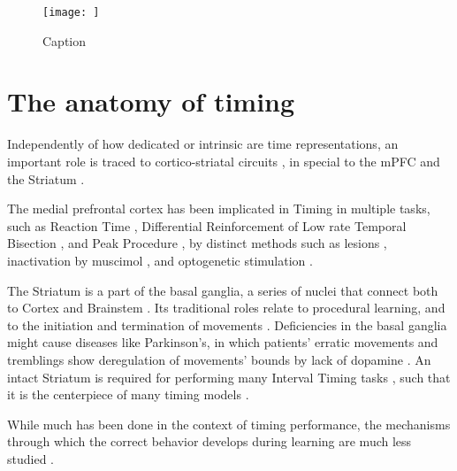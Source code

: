 \begin{figure}
    \centering
    \texttt{[image: ]}
    \caption{Caption}
    \label{fig:my_label}
\end{figure}




\section{The anatomy of timing}
\label{sec:anatomy}
Independently of how dedicated or intrinsic are time representations, an important role is traced to cortico-striatal circuits \cite{lusk2016utilizing, buhusi2005makes, meck2008cortico}, in special to the mPFC \cite{buhusi2018inactivation} and the Striatum \cite{mello2015scalable}.

The medial prefrontal cortex has been implicated in Timing in multiple tasks, such as Reaction Time \cite{narayanan2009delay}, Differential Reinforcement of Low rate \cite{cho2010differential} Temporal Bisection \cite{kim2009inactivation,tiganj2016sequential,kim2013neural}, and Peak Procedure \cite{buhusi2018inactivation}, by distinct methods such as lesions \cite{cho2010differential}, inactivation by muscimol \cite{buhusi2018inactivation, kim2009inactivation}, and optogenetic stimulation \cite{kim2017optogenetic}.

The Striatum is a part of the basal ganglia, a series of nuclei that connect both to Cortex and Brainstem \cite{helie2015learning}. Its traditional roles relate to procedural learning, and to the initiation and termination of movements \cite{helie2015learning}. Deficiencies in the basal ganglia might cause diseases like Parkinson's, in which patients' erratic movements and tremblings show deregulation of movements' bounds by lack of dopamine \cite{buhusi2005makes}. An intact Striatum is required for performing many Interval Timing tasks \cite{mello2015scalable,gouvea2015striatal,cho2010differential}, such that it is the centerpiece of many timing models \cite{mello2015scalable, buhusi2005makes}.

While much has been done in the context of timing performance, the mechanisms through which the correct behavior develops during learning are much less studied \cite{van20168}.